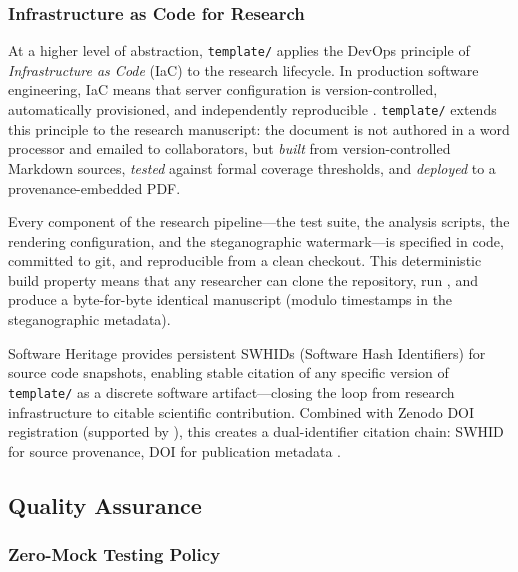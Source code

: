 \documentclass[
]{article}
\begin{document}
\subsubsection{Infrastructure as Code for
Research}\label{infrastructure-as-code-for-research}

At a higher level of abstraction, \texttt{template/} applies the DevOps
principle of \emph{Infrastructure as Code} (IaC) to the research
lifecycle. In production software engineering, IaC means that server
configuration is version-controlled, automatically provisioned, and
independently reproducible \citep{wilson2017good}. \texttt{template/}
extends this principle to the research manuscript: the document is not
authored in a word processor and emailed to collaborators, but
\emph{built} from version-controlled Markdown sources, \emph{tested}
against formal coverage thresholds, and \emph{deployed} to a
provenance-embedded PDF.

Every component of the research pipeline---the test suite, the analysis
scripts, the rendering configuration, and the steganographic
watermark---is specified in code, committed to git, and reproducible
from a clean checkout. This deterministic build property means that any
researcher can clone the repository, run
, and produce a byte-for-byte identical
manuscript (modulo timestamps in the steganographic metadata).

Software Heritage \citep{cosmo2020softwareheritage} provides persistent
SWHIDs (Software Hash Identifiers) for source code snapshots, enabling
stable citation of any specific version of \texttt{template/} as a
discrete software artifact---closing the loop from research
infrastructure to citable scientific contribution. Combined with Zenodo
DOI registration (supported by ), this
creates a dual-identifier citation chain: SWHID for source provenance,
DOI for publication metadata \citep{katz2021software}.

\newpage

\subsection{Quality Assurance}\label{quality-assurance}

\subsubsection{Zero-Mock Testing Policy}\label{zero-mock-testing-policy}
\end{document}
